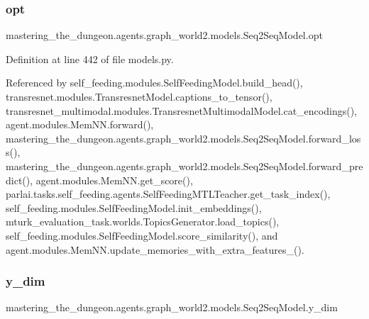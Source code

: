 \subsubsection{\texorpdfstring{opt}{opt}}
{\footnotesize\ttfamily mastering\+\_\+the\+\_\+dungeon.\+agents.\+graph\+\_\+world2.\+models.\+Seq2\+Seq\+Model.\+opt}



Definition at line 442 of file models.\+py.



Referenced by self\+\_\+feeding.\+modules.\+Self\+Feeding\+Model.\+build\+\_\+head(), transresnet.\+modules.\+Transresnet\+Model.\+captions\+\_\+to\+\_\+tensor(), transresnet\+\_\+multimodal.\+modules.\+Transresnet\+Multimodal\+Model.\+cat\+\_\+encodings(), agent.\+modules.\+Mem\+N\+N.\+forward(), mastering\+\_\+the\+\_\+dungeon.\+agents.\+graph\+\_\+world2.\+models.\+Seq2\+Seq\+Model.\+forward\+\_\+loss(), mastering\+\_\+the\+\_\+dungeon.\+agents.\+graph\+\_\+world2.\+models.\+Seq2\+Seq\+Model.\+forward\+\_\+predict(), agent.\+modules.\+Mem\+N\+N.\+get\+\_\+score(), parlai.\+tasks.\+self\+\_\+feeding.\+agents.\+Self\+Feeding\+M\+T\+L\+Teacher.\+get\+\_\+task\+\_\+index(), self\+\_\+feeding.\+modules.\+Self\+Feeding\+Model.\+init\+\_\+embeddings(), mturk\+\_\+evaluation\+\_\+task.\+worlds.\+Topics\+Generator.\+load\+\_\+topics(), self\+\_\+feeding.\+modules.\+Self\+Feeding\+Model.\+score\+\_\+similarity(), and agent.\+modules.\+Mem\+N\+N.\+update\+\_\+memories\+\_\+with\+\_\+extra\+\_\+features\+\_\+().

\mbox{\label{classmastering__the__dungeon_1_1agents_1_1graph__world2_1_1models_1_1Seq2SeqModel_acaeacfb61bed4e91cb7c243ed0bbb405}} 
\subsubsection{\texorpdfstring{y\+\_\+dim}{y\_dim}}
{\footnotesize\ttfamily mastering\+\_\+the\+\_\+dungeon.\+agents.\+graph\+\_\+world2.\+models.\+Seq2\+Seq\+Model.\+y\+\_\+dim}



